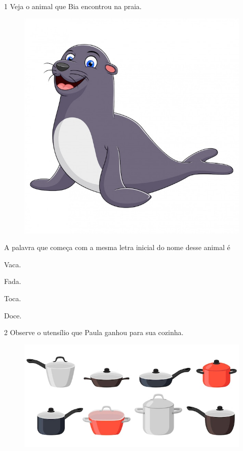 
\num{1} Veja o animal que Bia encontrou na praia.

\begin{figure}[htpb!]
\centering
\includegraphics[width=.5\textwidth]{media/image139.jpeg}
\end{figure}


A palavra que começa com a mesma letra inicial do nome desse animal é

\begin{multicols}{2}
\begin{escolha}
\item Vaca.

\item Fada.

\item Toca.

\item Doce.
\end{escolha}
\end{multicols}

\num{2} Observe o utensílio que Paula ganhou para sua cozinha.

\begin{figure}[htpb!]
\centering
\includegraphics[width=.5\textwidth]{media/image19.jpeg}
\end{figure}


